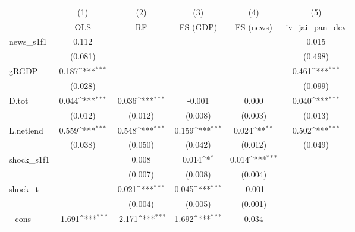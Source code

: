 {
\def\sym#1{\ifmmode^{#1}\else\(^{#1}\)\fi}
\begin{tabular}{l*{5}{c}}
\toprule
            &\multicolumn{1}{c}{(1)}&\multicolumn{1}{c}{(2)}&\multicolumn{1}{c}{(3)}&\multicolumn{1}{c}{(4)}&\multicolumn{1}{c}{(5)}\\
            &\multicolumn{1}{c}{OLS}&\multicolumn{1}{c}{RF}&\multicolumn{1}{c}{FS (GDP)}&\multicolumn{1}{c}{FS (news)}&\multicolumn{1}{c}{iv\_jai\_pan\_dev}\\
\midrule
news\_s1f1   &       0.112         &                     &                     &                     &       0.015         \\
            &     (0.081)         &                     &                     &                     &     (0.498)         \\
\addlinespace
gRGDP       &       0.187\sym{***}&                     &                     &                     &       0.461\sym{***}\\
            &     (0.028)         &                     &                     &                     &     (0.099)         \\
\addlinespace
D.tot       &       0.044\sym{***}&       0.036\sym{***}&      -0.001         &       0.000         &       0.040\sym{***}\\
            &     (0.012)         &     (0.012)         &     (0.008)         &     (0.003)         &     (0.013)         \\
\addlinespace
L.netlend   &       0.559\sym{***}&       0.548\sym{***}&       0.159\sym{***}&       0.024\sym{**} &       0.502\sym{***}\\
            &     (0.038)         &     (0.050)         &     (0.042)         &     (0.012)         &     (0.049)         \\
\addlinespace
shock\_s1f1  &                     &       0.008         &       0.014\sym{*}  &       0.014\sym{***}&                     \\
            &                     &     (0.007)         &     (0.008)         &     (0.004)         &                     \\
\addlinespace
shock\_t     &                     &       0.021\sym{***}&       0.045\sym{***}&      -0.001         &                     \\
            &                     &     (0.004)         &     (0.005)         &     (0.001)         &                     \\
\addlinespace
\_cons      &      -1.691\sym{***}&      -2.171\sym{***}&       1.692\sym{***}&       0.034         &                     \\

\end{tabular}}
